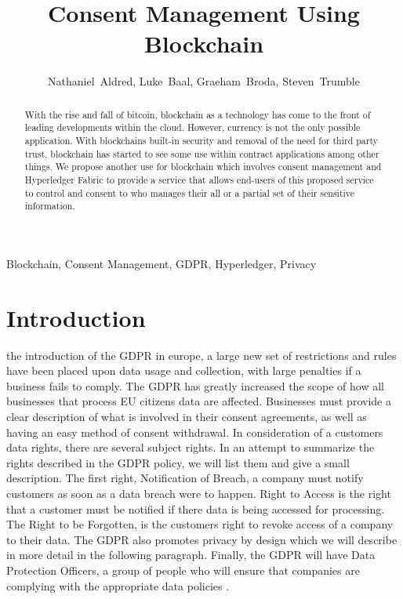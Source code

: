 \documentclass[11pt,journal]{IEEEtran}
\begin{document}
\title{Consent Management Using Blockchain}
\author{Nathaniel~Aldred, 
        Luke~Baal,
        Graeham~Broda,
        Steven~Trumble}

\maketitle

\begin{abstract}
  With the rise and fall of bitcoin, blockchain as a technology has come to the front of leading developments within the cloud. However, currency is not the only possible application. With blockchains built-in security and removal of the need for third party trust, blockchain has started to see some use within contract applications among other things. We propose another use for blockchain which involves consent management and Hyperledger Fabric to provide a service that allows end-users of this proposed service to control and consent to who manages their all or a partial set of their sensitive information.
\end{abstract}

\begin{IEEEkeywords}
  Blockchain, Consent Management, GDPR, Hyperledger, Privacy
\end{IEEEkeywords}

\section{Introduction}
 the introduction of the GDPR in europe, a large new set of restrictions and rules have been placed upon data usage and collection, with large penalties if a business fails to comply. The GDPR has greatly increased the scope of how all businesses that process EU citizens data are affected. Businesses must provide a clear description of what is involved in their consent agreements, as well as having an easy method of consent withdrawal. In consideration of a customers data rights, there are several subject rights.  In an attempt to summarize the rights described in the GDPR policy, we will list them and give a small description.  The first right, Notification of Breach, a company must notify customers as soon as a data breach were to happen.  Right to Access is the right that a customer must be notified if there data is being accessed for processing.  The Right to be Forgotten, is the customers right to revoke access of a company to their data.  The GDPR also promotes privacy by design which we will describe in more detail in the following paragraph.  Finally, the GDPR will have Data Protection Officers, a group of people who will ensure that companies are complying with the appropriate data policies \cite{KeyChang80:online}.
\end{document}
